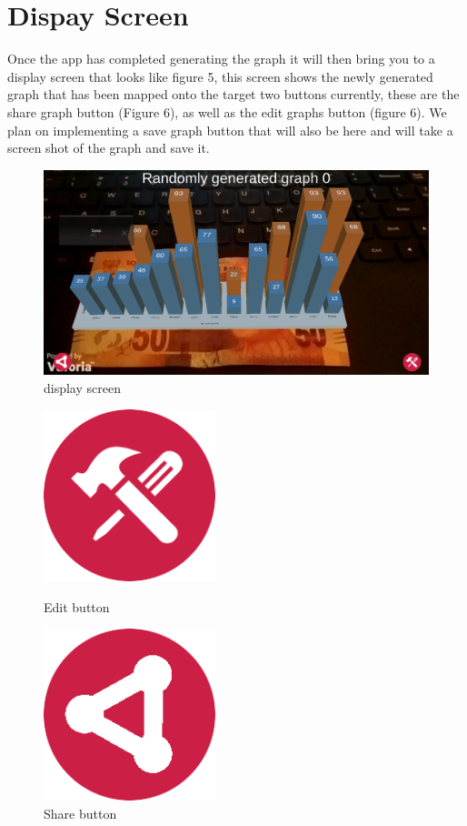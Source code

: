 \documentclass[a4paper,12pt]{article}
\begin{document}
\section{Dispay Screen}
Once the app has completed generating the graph it will then bring you to a display screen that looks like figure 5, this screen shows the newly generated graph that has been mapped onto the target two buttons currently, these are the share graph button (Figure 6), as well as the edit graphs button (figure 6). We plan on implementing a save graph button that will also be here and will take a screen shot of the graph and save it. 

\begin{figure}[H]
\centering
	\includegraphics[width=\textwidth]{images/graph.png}
	\caption{display screen \label{overflow}}
\end{figure}

\begin{figure}[H]
  \centering
  \begin{minipage}[b]{0.4\textwidth}
    \includegraphics[width=50mm]{images/editRed.png}
    \caption{Edit button}
  \end{minipage}
  \hfill
  \begin{minipage}[b]{0.4\textwidth}
    \includegraphics[width=50mm]{images/shareRed.png}
    \caption{Share button}
  \end{minipage}
\end{figure}
\newpage
\end{document}
